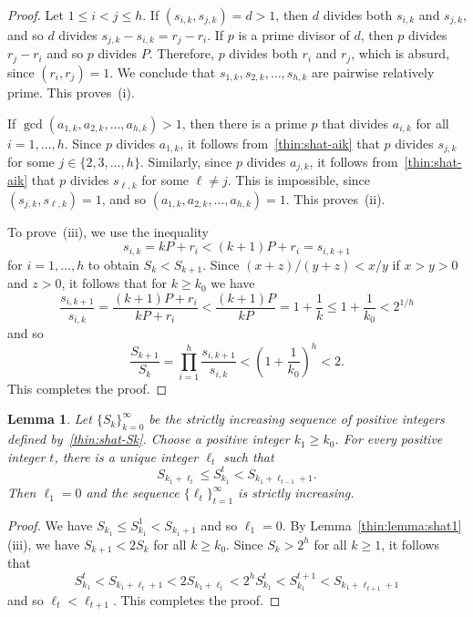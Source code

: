 \documentclass{amsart}
\newtheorem{lemma}{Lemma}
\begin{document}
\begin{proof}
Let $1 \leq i < j \leq h$.  If $(s_{i,k},s_{j,k}) = d >1$, then $d$ divides both $s_{i,k}$ and $s_{j,k}$, and so $d$ divides 
$s_{j,k} - s_{i,k} = r_j - r_i $.  If $p$ is a prime divisor of $d$, then $p$ divides $r_j - r_i $ and so $p$ divides $P$.  Therefore, $p$ divides both $r_i$ and $r_j$, which is absurd, since $(r_i,r_j) = 1$.  We conclude that $s_{1,k}, s_{2,k}, \ldots, s_{h,k}$ are pairwise relatively prime.  This proves~(i).

If $\gcd( a_{1,k}, a_{2,k}, \ldots, a_{h,k} ) > 1$, then there is a prime $p$ that divides $a_{i,k}$ for all $i = 1,\ldots, h$.  Since $p$ divides $a_{1,k}$, it follows from~\eqref{thin:shat-aik} that $p$ divides $s_{j,k}$ for some $j \in \{2,3,\ldots, h\}$.  Similarly, since $p$ divides $a_{j,k}$, it follows from~\eqref{thin:shat-aik} that $p$ divides $s_{\ell,k}$ for some $\ell \neq j$.  This is impossible, since $(s_{j,k},s_{\ell,k}) =1$, and so $( a_{1,k}, a_{2,k}, \ldots, a_{h,k} ) = 1$.   This proves~(ii).

To prove~(iii), we use the inequality 
\[
s_{i,k} = kP+r_i < (k+1)P+r_i = s_{i,k+1}
\]
for $i = 1,\ldots, h$ to obtain $S_k < S_{k+1}$.  
Since $(x+z)/(y+z) < x/y$ if $x > y > 0$ and $z > 0$, it follows that for $k \geq k_0$ we have 
\[
\frac{s_{i,k+1}}{s_{i,k}} = \frac{(k+1)P + r_i}{k P+r_i} 
< \frac{(k+1)P }{kP } =1 +\frac{1}{k}  \leq 1 +\frac{1}{k_0} < 2^{1/h}
\]
and so
\[
\frac{S_{k+1}}{S_k} = \prod_{i=1}^h \frac{s_{i,k+1}}{s_{i,k}} < \left( 1 +\frac{1}{k_0} \right)^h < 2.
\]
This completes the proof.  
\end{proof}

\begin{lemma}         \label{thin:lemma:shat2}
Let  $\{S_k\}_{k=0}^{\infty}$ be the strictly increasing sequence of positive integers defined by~\eqref{thin:shat-Sk}.   
Choose a positive integer $k_1 \geq k_0$. 
For every positive integer $t$, there is a unique integer $\ell_t$ such that 
\begin{equation}  \label{thin:ShatSeq}
S_{k_1+\ell_t} \leq S_{k_1}^{t} < S_{k_1+\ell_{t -1} +1}.
\end{equation}
Then $\ell_1 = 0$ and  the sequence $\{\ell_t\}_{t=1}^{\infty}$ is strictly increasing. 
\end{lemma}

\begin{proof}
We have $S_{k_1} \leq S_{k_1}^1 < S_{k_1+1}$ and so $\ell_1 = 0$.   By Lemma~\ref{thin:lemma:shat1} (iii),  we have $S_{k+1} < 2S_k$ for all $k \geq k_0$.  Since $S_k > 2^h$ for all $k\geq 1$, it follows that 
\[
S_{k_1}^t < S_{k_1+\ell_t + 1} < 2S_{k_1+\ell_t} < 2^h S_{k_1}^t 
< S_{k_1}^{t+1} < S_{k_1 + \ell_{t+1} + 1}
\]
and so $\ell_t  <  \ell_{t+1}$.  This completes the proof.  
\end{proof}
\end{document}
